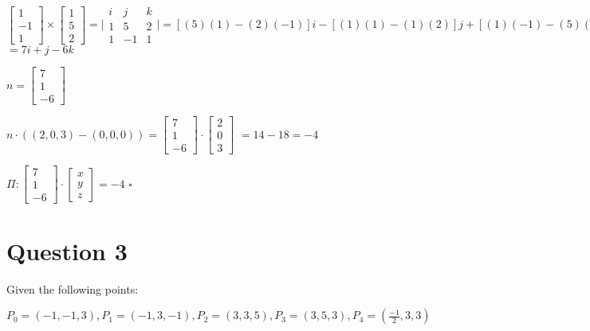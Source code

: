 \documentclass{article}
\begin{document}
\begin{enumerate}
        $\begin{bmatrix} 1 \\ -1 \\ 1 \end{bmatrix} \times \begin{bmatrix} 1 \\ 5 \\ 2\end{bmatrix} = \Bigg | \begin{matrix}
            i & j & k \\
            1 & 5 & 2 \\
            1 & -1 & 1
        \end{matrix} \Bigg | = [(5)(1) - (2)(-1)] i - [(1)(1) - (1)(2)] j + [(1)(-1) - (5)(1)] k$
        $ = 7i + j - 6k$

        $n = \begin{bmatrix} 7 \\ 1 \\ -6 \end{bmatrix}$

        $n \cdot ((2, 0, 3) - (0, 0, 0)) = \begin{bmatrix} 7 \\ 1 \\ -6 \end{bmatrix} \cdot \begin{bmatrix} 2 \\ 0 \\ 3 \end{bmatrix}$
        $ = 14 - 18 = -4 $

        $\Pi : \begin{bmatrix} 7 \\ 1 \\ -6 \end{bmatrix} \cdot \begin{bmatrix} x \\ y \\ z \end{bmatrix} = -4$ $\square$
        
    \end{enumerate}
    
    \section*{Question 3}
    Given the following points: 
    
    $P_0 =(-1,-1,3),P_1 =(-1,3,-1),P_2=(3,3,5),P_3=(3,5,3),P_4=(\frac{-1}{2},3,3)$
\end{document}
